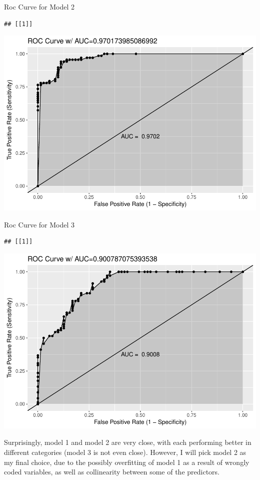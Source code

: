 \documentclass[]{article}
\begin{document}
Roc Curve for Model 2

\begin{verbatim}
## [[1]]
\end{verbatim}

\includegraphics{DATA_621_Homework_3_files/figure-latex/roc-plot-2-1.pdf}

Roc Curve for Model 3

\begin{verbatim}
## [[1]]
\end{verbatim}

\includegraphics{DATA_621_Homework_3_files/figure-latex/roc-plot-3-1.pdf}

Surprisingly, model 1 and model 2 are very close, with each performing
better in different categories (model 3 is not even close). However, I
will pick model 2 as my final choice, due to the possibly overfitting of
model 1 as a result of wrongly coded variables, as well as collinearity
between some of the predictors.
\end{document}
